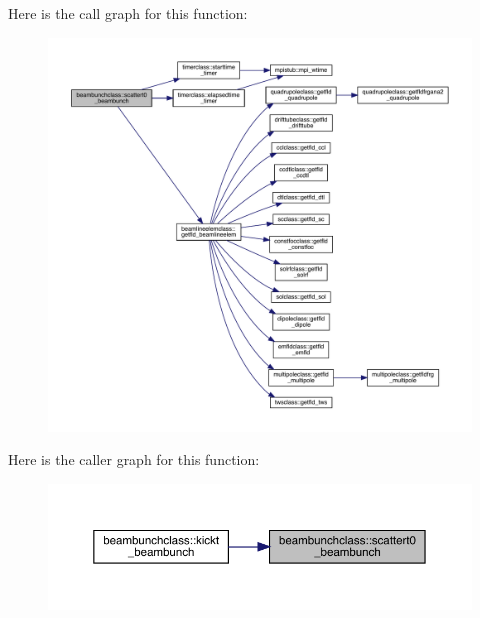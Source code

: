 Here is the call graph for this function\+:\nopagebreak
\begin{figure}[H]
\begin{center}
\leavevmode
\includegraphics[width=350pt]{namespacebeambunchclass_a80dd0ce0010992cda1f2ba4d873371e0_cgraph}
\end{center}
\end{figure}
Here is the caller graph for this function\+:\nopagebreak
\begin{figure}[H]
\begin{center}
\leavevmode
\includegraphics[width=350pt]{namespacebeambunchclass_a80dd0ce0010992cda1f2ba4d873371e0_icgraph}
\end{center}
\end{figure}
\mbox{\label{namespacebeambunchclass_a3da6bfdf683e278c6005fddbceac16db}} 
